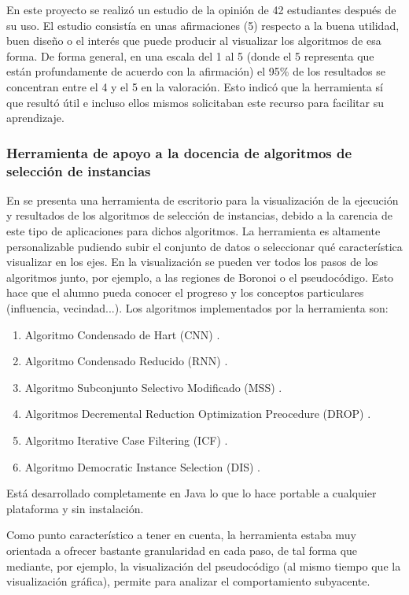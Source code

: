 En este proyecto se realizó un estudio de la opinión de 42 estudiantes después
de su uso. El estudio consistía en unas afirmaciones (5) respecto a la buena
utilidad, buen diseño o el interés que puede producir al visualizar los
algoritmos de esa forma. De forma general, en una escala del 1 al 5 (donde el 5
representa que están profundamente de acuerdo con la afirmación) el 95\% de los
resultados se concentran entre el 4 y el 5 en la valoración. Esto indicó que la
herramienta sí que resultó útil e incluso ellos mismos solicitaban este recurso
para facilitar su aprendizaje.

\subsubsection{Herramienta de apoyo a la docencia de algoritmos de selección de instancias}
En \cite{arnaiz2012herramienta} se presenta una herramienta de escritorio para
la visualización de la ejecución y resultados de los algoritmos de selección de
instancias, debido a la carencia de este tipo de aplicaciones para dichos
algoritmos. La herramienta es altamente personalizable pudiendo subir el
conjunto de datos o seleccionar qué característica visualizar en los ejes. En la
visualización se pueden ver todos los pasos de los algoritmos junto, por
ejemplo, a las regiones de Boronoi o el pseudocódigo. Esto hace que el alumno
pueda conocer el progreso y los conceptos particulares (influencia,
vecindad...). Los algoritmos implementados por la herramienta son:
\begin{enumerate}
    \item Algoritmo Condensado de Hart (CNN) \cite{CNNHart1968}.
    \item Algoritmo Condensado Reducido (RNN) \cite{RNNGates1972}.
    \item Algoritmo Subconjunto Selectivo Modificado (MSS) \cite{MSSBarandela2005}.
    \item Algoritmos Decremental Reduction Optimization Preocedure (DROP) \cite{DROPWilson2000}.
    \item Algoritmo Iterative Case Filtering (ICF) \cite{ICFBrighton2002}.
    \item Algoritmo Democratic Instance Selection (DIS) \cite{DemoISGarcia2010}.
\end{enumerate}
Está desarrollado completamente en Java lo que lo hace portable a cualquier
plataforma y sin instalación.

Como punto característico a tener en cuenta, la herramienta estaba muy orientada
a ofrecer bastante granularidad en cada paso, de tal forma que mediante, por
ejemplo, la visualización del pseudocódigo (al mismo tiempo que la visualización
gráfica), permite para analizar el comportamiento subyacente.

